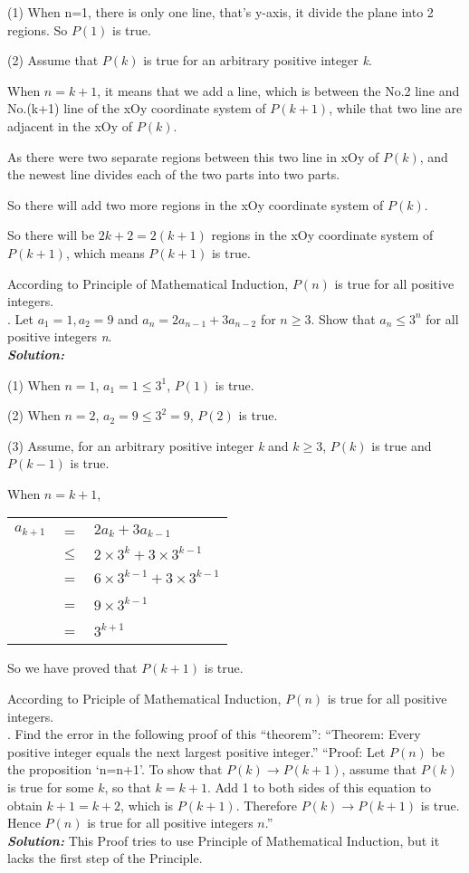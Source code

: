 \documentclass[11pt, oneside]{article}   	%
\begin{document}
(1) When n=1, there is only one line, that's y-axis, it divide the plane into 2 regions. So $P(1)$ is true.

(2) Assume that $P(k)$ is true for an arbitrary positive integer \emph{k}.

When $n=k+1$, it means that we add a line, which is between the No.2 line and No.(k+1) line of the xOy coordinate system of $P(k+1)$, while that two line are adjacent in the xOy of $P(k)$.

As there were two separate regions between this two line in xOy of $P(k)$, and the newest line divides each of the two parts into two parts.

So there will add two more regions in the xOy coordinate system of $P(k)$.

So there will be $2k+2=2(k+1)$ regions in the xOy coordinate system of $P(k+1)$, which means $P(k+1)$ is true.

According to Principle of Mathematical Induction, $P(n)$ is true for all positive integers.\\

. Let $a_{1}=1,a_{2}=9$ and $a_{n}=2a_{n-1}+3a_{n-2}$ for $n\ge 3$. Show that $a_{n}\le 3^{n}$ for all positive integers \emph{n}.\\
\textbf{\emph{Solution:}}

(1) When $n=1$, $a_{1}=1\le 3^{1}$, $P(1)$ is true.

(2) When $n=2$, $a_{2}=9 \le 3^{2}=9$, $P(2)$ is true.

(3) Assume, for an arbitrary positive integer \emph{k} and $k\ge 3$, $P(k)$ is true and $P(k-1)$ is true.

When $n=k+1$,

\begin{tabular}{@{} rcl @{}}
\qquad $a_{k+1}$&=&$2a_{k}+3a_{k-1}$\\
&$\le$&$2\times 3^{k}+3\times 3^{k-1}$\\
&=&$6\times 3^{k-1}+3\times 3^{k-1}$\\
&=&$9\times3^{k-1}$\\
&=&$3^{k+1}$
\end{tabular}

So we have proved that $P(k+1)$ is true.

According to Priciple of Mathematical Induction, $P(n)$ is true for all positive integers.\\

. Find the error in the following proof of this ``theorem'': ``Theorem: Every positive integer equals the next largest positive integer.'' ``Proof: Let $P(n)$ be the proposition `n=n+1'. To show that $P(k)\to P(k+1)$, assume that $P(k)$ is true for some $k$, so that $k=k+1$. Add 1 to both sides of this equation to obtain $k+1=k+2$, which is $P(k+1)$. Therefore $P(k)\to P(k+1)$ is true. Hence $P(n)$ is true for all positive integers $n$.''\\
\textbf{\emph{Solution:}} This Proof tries to use Principle of Mathematical Induction, but it lacks the first step of the Principle.
\end{document}
